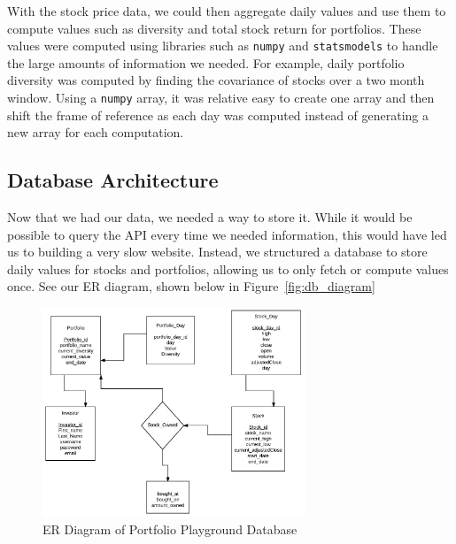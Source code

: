 \documentclass{article}
\begin{document}
With the stock price data, we could then aggregate daily values and use them to compute values such as diversity and total stock return for portfolios.  These values were computed using libraries such as \texttt{numpy} and \texttt{statsmodels} to handle the large amounts of information we needed.  For example, daily portfolio diversity was computed by finding the covariance of stocks over a two month window.  Using a \texttt{numpy} array, it was relative easy to create one array and then shift the frame of reference as each day was computed instead of generating a new array for each computation.

\subsection{Database Architecture}
Now that we had our data, we needed a way to store it.  While it would be possible to query the API every time we needed information, this would have led us to building a very slow website.  Instead, we structured a database to store daily values for stocks and portfolios, allowing us to only fetch or compute values once.  See our ER diagram, shown below in Figure~\ref{fig:db_diagram}

\begin{figure}[H]
\begin{center}
\includegraphics[width=0.7\textwidth]{db_diagram}
\caption{ER Diagram of Portfolio Playground Database}
\end{center}
\end{figure}
\end{document}
